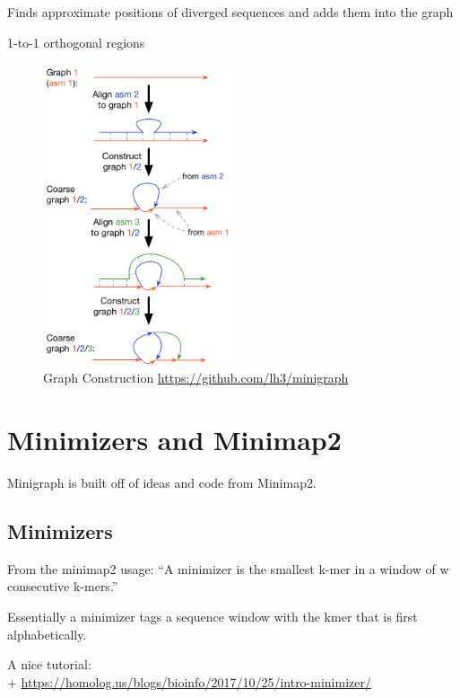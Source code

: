 \documentclass[
]{book}
\begin{document}
Finds approximate positions of diverged sequences and adds them into the graph

1-to-1 orthogonal regions

\begin{figure}
\centering
\includegraphics[width=0.5\textwidth,height=\textheight]{./Figures/Minigraph.png}
\caption{Graph Construction \url{https://github.com/lh3/minigraph}}
\end{figure}

\hypertarget{minimizers-and-minimap2}{%
\section{Minimizers and Minimap2}\label{minimizers-and-minimap2}}

Minigraph is built off of ideas and code from Minimap2.

\hypertarget{minimizers}{%
\subsection*{Minimizers}\label{minimizers}}

From the minimap2 usage:
``A minimizer is the smallest k-mer in a window of w consecutive k-mers.''

Essentially a minimizer tags a sequence window with the kmer that is first alphabetically.

A nice tutorial:\\
+ \url{https://homolog.us/blogs/bioinfo/2017/10/25/intro-minimizer/}
\end{document}
